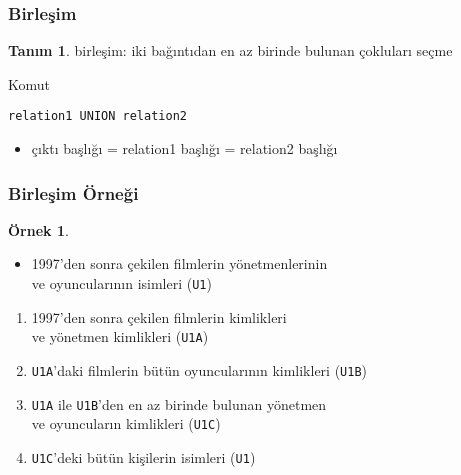 \documentclass[dvipsnames]{beamer}
\theoremstyle{definition}
\newtheorem{tanim}[theorem]{Tanım}
\theoremstyle{example}
\newtheorem{ornek}[theorem]{Örnek}
\theoremstyle{plain}
\begin{document}
\begin{frame}[fragile]
  \frametitle{Birleşim}

  \begin{tanim}
    \alert{birleşim}: iki bağıntıdan en az birinde bulunan çokluları seçme
  \end{tanim}

  \pause
  \begin{block}{Komut}
    \begin{lstlisting}
relation1 UNION relation2
    \end{lstlisting}
  \end{block}

  \pause
  \begin{itemize}
    \item çıktı başlığı = relation1 başlığı = relation2 başlığı
  \end{itemize}
\end{frame}

\begin{frame}
  \frametitle{Birleşim Örneği}

  \begin{ornek}
    \begin{itemize}
      \item 1997'den sonra çekilen filmlerin yönetmenlerinin\\
        ve oyuncularının isimleri (\texttt{U1})
    \end{itemize}

    \pause
    \begin{enumerate}
      \item 1997'den sonra çekilen filmlerin kimlikleri\\
        ve yönetmen kimlikleri (\texttt{U1A})

      \pause
      \item \texttt{U1A}'daki filmlerin bütün oyuncularının kimlikleri (\texttt{U1B})

      \pause
      \item \texttt{U1A} ile \texttt{U1B}'den en az birinde bulunan yönetmen\\
        ve oyuncuların kimlikleri (\texttt{U1C})

      \pause
      \item \texttt{U1C}'deki bütün kişilerin isimleri (\texttt{U1})
    \end{enumerate}
  \end{ornek}
\end{frame}
\end{document}
